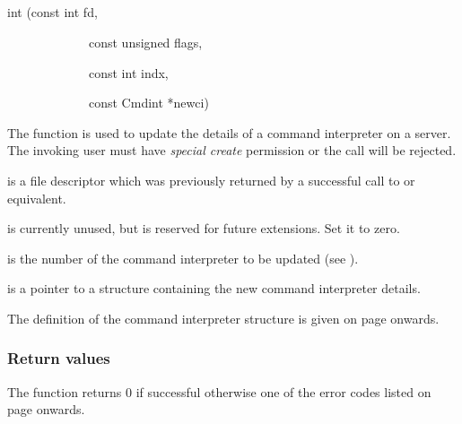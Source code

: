 \subsection{\funcnameXBciupd{}}

\begin{expara}

int \funcnameXBciupd{}(const int fd,

\ \ \ \ \ \ \ \ \ \ \ \ \ const unsigned flags,

\ \ \ \ \ \ \ \ \ \ \ \ \ const int indx,

\ \ \ \ \ \ \ \ \ \ \ \ \ const Cmdint *newci)

\end{expara}

The function \funcXBciupd{} is used to update the
details of a command interpreter on a
\ProductName{} server. The invoking user must have
\textit{special create} permission or the call will be rejected.

 is a file descriptor which was previously
returned by a successful call to \funcXBopen{} or equivalent.

 is currently unused, but is reserved for
future extensions. Set it to zero.

 is the number of the command interpreter to
be updated (see \funcXBciread{}).

 is a pointer to a structure containing the
new command interpreter details.

The definition of the command interpreter structure is given on page
\pageref{bkm:Cmdinterp} onwards.

\subsubsection{Return values}
The function returns 0 if successful otherwise one of the error codes
listed on page \pageref{errorcodes} onwards.

